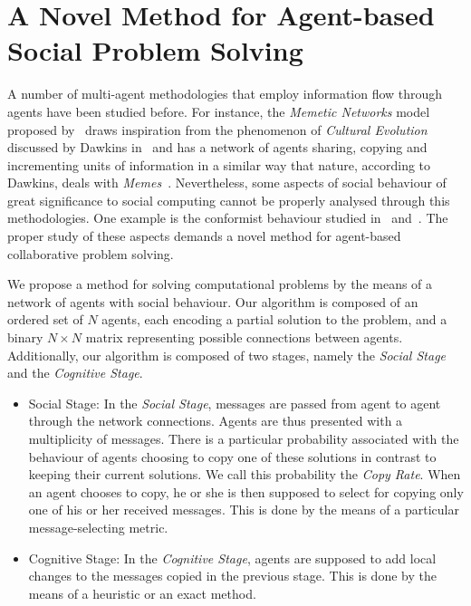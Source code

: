 \documentclass[letterpaper]{article}
\begin{document}
\section{A Novel Method for Agent-based Social Problem Solving}

A number of multi-agent methodologies that employ information flow through agents have been studied before. For instance, the {\em Memetic Networks} model proposed by~\cite{lamb:memenet} draws inspiration from the phenomenon of {\em Cultural Evolution} discussed by Dawkins in~\cite{dawkins:selfishgene} and has a network of agents sharing, copying and incrementing units of information in a similar way that nature, according to Dawkins, deals with {\em Memes}~\cite{dawkins:selfishgene}. Nevertheless, some aspects of social behaviour of great significance to social computing cannot be properly analysed through this methodologies. One example is the conformist behaviour studied in~\cite{cefferson:conformists} and~\cite{farenzena:collabem}. The proper study of these aspects demands a novel method for agent-based collaborative problem solving.

We propose a method for solving computational problems by the means of a network of agents with social behaviour. Our algorithm is composed of an ordered set of $N$ agents, each encoding a partial solution to the problem, and a binary $N \times N$ matrix representing possible connections between agents. Additionally, our algorithm is composed of two stages, namely the {\em Social Stage} and the {\em Cognitive Stage}. 

\begin{itemize}
\item
Social Stage: In the {\em Social Stage}, messages are passed from agent to agent through the network connections. Agents are thus presented with a multiplicity of messages. There is a particular probability associated with the behaviour of agents choosing to copy one of these solutions in contrast to keeping their current solutions. We call this probability the {\em Copy Rate}. When an agent chooses to copy, he or she is then supposed to select for copying only one of his or her received messages. This is done by the means of a particular message-selecting metric.

\item
Cognitive Stage: In the {\em Cognitive Stage}, agents are supposed to add local changes to the messages copied in the previous stage. This is done by the means of a heuristic or an exact method.
\end{itemize}
\end{document}
